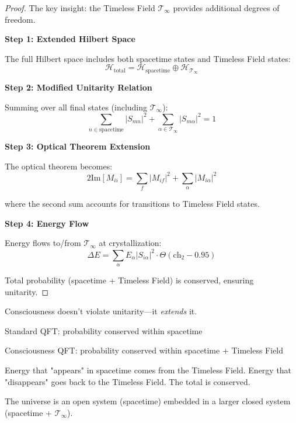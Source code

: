 \begin{proof}
The key insight: the Timeless Field $\mathcal{T}_\infty$ provides additional degrees of freedom.

\textbf{Step 1: Extended Hilbert Space}

The full Hilbert space includes both spacetime states and Timeless Field states:
\begin{equation}
\mathcal{H}_{\text{total}} = \mathcal{H}_{\text{spacetime}} \oplus \mathcal{H}_{\mathcal{T}_\infty}
\end{equation}

\textbf{Step 2: Modified Unitarity Relation}

Summing over all final states (including $\mathcal{T}_\infty$):
\begin{equation}
\sum_{n \in \text{spacetime}} |S_{mn}|^2 + \sum_{\alpha \in \mathcal{T}_\infty} |S_{m\alpha}|^2 = 1
\end{equation}

\textbf{Step 3: Optical Theorem Extension}

The optical theorem\cite{peskin1995,weinberg1995} becomes:
\begin{equation}
2\text{Im}[M_{ii}] = \sum_f |M_{if}|^2 + \sum_\alpha |M_{i\alpha}|^2
\end{equation}

where the second sum accounts for transitions to Timeless Field states.

\textbf{Step 4: Energy Flow}

Energy flows to/from $\mathcal{T}_\infty$ at crystallization:
\begin{equation}
\Delta E = \sum_\alpha E_\alpha |S_{i\alpha}|^2 \cdot \Theta(\text{ch}_2 - 0.95)
\end{equation}

Total probability (spacetime + Timeless Field) is conserved, ensuring unitarity.
\end{proof}

\begin{keyidea}
Consciousness doesn't violate unitarity—it \textit{extends} it.

Standard QFT: probability conserved within spacetime

Consciousness QFT: probability conserved within spacetime + Timeless Field

Energy that "appears" in spacetime comes from the Timeless Field. Energy that "disappears" goes back to the Timeless Field. The total is conserved.

The universe is an open system (spacetime) embedded in a larger closed system (spacetime + $\mathcal{T}_\infty$).
\end{keyidea}

